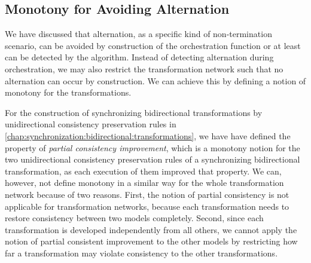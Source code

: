 

\subsection{Monotony for Avoiding Alternation}

We have discussed %
that alternation, as a specific kind of non-termination scenario, can be avoided by construction of the orchestration function or at least can be detected by the  algorithm.
Instead of detecting alternation during orchestration, we may also restrict the transformation network such that no alternation can occur by construction.
We can achieve this by defining a notion of monotony for the transformations.

For the construction of synchronizing bidirectional transformations by unidirectional consistency preservation rules in \autoref{chap:synchronization:bidirectional:transformations}, we have have defined the property of \emph{partial consistency improvement}, which is a monotony notion for the two unidirectional consistency preservation rules of a synchronizing bidirectional transformation, as each execution of them improved that property.
We can, however, not define monotony in a similar way for the whole transformation network because of two reasons.
First, the notion of partial consistency is not applicable for transformation networks, because each transformation needs to restore consistency between two models completely.
Second, since each transformation is developed independently from all others, we cannot apply the notion of partial consistent improvement to the other models by restricting how far a transformation may violate consistency to the other transformations.

